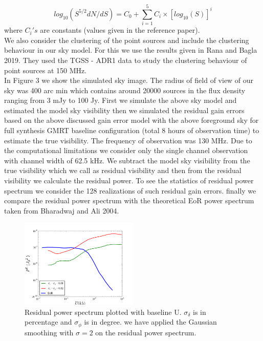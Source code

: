 \documentclass[fleqn,usenatbib]{mnras}
\begin{document}
\begin{equation}
log_{10}(S^{5/2}dN/dS)  = C_0 + \sum _{i=1}^{5}C_i\times[log_{10}(S)]^i
\end{equation}
where $C_i's$ are constants (values given in the reference paper). \\
We also consider the clustering of the point sources and include the clustering behaviour in our sky model. For this we use the results given in Rana and Bagla 2019. They used the TGSS - ADR1 data to study the clustering behaviour of point sources at 150 MHz.\\
In Figure 3 we show the simulated sky image. The radius of field of view of our sky was 400 arc min which contains around 20000 sources in the flux density ranging from 3 mJy to 100 Jy.
First we simulate the above sky model and estimated the model sky visibility then we simulated the residual gain errors based on the above discussed gain error model with the above foreground sky for full synthesis GMRT baseline configuration (total 8 hours of observation time) to estimate the true visibility. The frequency of observation was 130 MHz. Due to the computational limitations we consider only the single channel observation with channel width of 62.5 kHz. We subtract the model sky visibility from the true visibility which we call as residual visibility and then from the residual visibility we calculate the residual power. To see the statistics of residual power spectrum we consider the 128 realizations of such residual gain errors. finally we compare the residual power spectrum with the theoretical EoR power spectrum taken from Bharadwaj and Ali 2004.\\
\begin{figure}
    \centering
    \includegraphics[width=0.5\textwidth]{ResPow_AP.png}
    \caption{Residual power spectrum plotted with baseline U. $\sigma_{\delta}$ is in percentage and $\sigma_{\phi}$ is in degree. we have applied the Gaussian smoothing with $\sigma = 2$ on the residual power spectrum.}
    \label{fig:my_label}
\end{figure}
\end{document}
